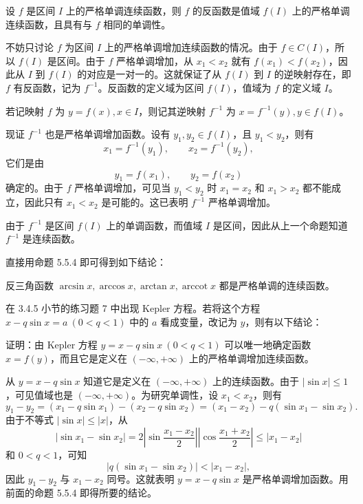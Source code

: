 \begin{xproposition}[5.5.4]
设 $f$ 是区间 $I$ 上的严格单调连续函数，则 $f$ 的反函数是值域 $f(I)$ 上的严格单调连续函数，且具有与 $f$ 相同的单调性。
\end{xproposition}
\begin{xproof}
不妨只讨论 $f$ 为区间 $I$ 上的严格单调增加连续函数的情况。由于 $f\in C(I)$，所以 $f(I)$ 是区间。由于 $f$ 严格单调增加，从 $x_1<x_2$ 就有 $f(x_1)<f(x_2)$，因此从 $I$ 到 $f(I)$ 的对应是一对一的。这就保证了从 $f(I)$ 到 $I$ 的逆映射存在，即 $f$ 有反函数，记为 $f^{-1}$。反函数的定义域为区间 $f(I)$，值域为 $f$ 的定义域 $I$。

若记映射 $f$ 为 $y=f(x),x\in I$，则记其逆映射 $f^{-1}$ 为 $x=f^{-1}(y),y\in f(I)$。

现证 $f^{-1}$ 也是严格单调增加函数。设有 $y_1,y_2\in f(I)$，且 $y_1<y_2$，则有
\[
  x_1=f^{-1}(y_1),\qquad x_2=f^{-1}(y_2),
\]
它们是由
\[
  y_1=f(x_1),\qquad y_2=f(x_2)
\]
确定的。由于 $f$ 严格单调增加，可见当 $y_1<y_2$ 时 $x_1=x_2$ 和 $x_1>x_2$ 都不能成立，因此只有 $x_1<x_2$ 是可能的。这已表明 $f^{-1}$ 严格单调增加。

由于 $f^{-1}$ 是区间 $f(I)$ 上的单调函数，而值域 $I$ 是区间，因此从上一个命题知道 $f^{-1}$ 是连续函数。
\end{xproof}

直接用命题 5.5.4 即可得到如下结论：

\begin{xexample}[5.5.1]
反三角函数 $\arcsin x,\arccos x,\arctan x,\operatorname{arccot}x$ 都是严格单调的连续函数。
\end{xexample}

在 3.4.5 小节的练习题 7 中出现 Kepler 方程。若将这个方程 $x-q\sin x=a\ (0<q<1)$ 中的 $a$ 看成变量，改记为 $y$，则有以下结论：

\begin{xexample}[5.5.2]
证明：由 Kepler 方程 $y=x-q\sin x\ (0<q<1)$ 可以唯一地确定函数 $x=f(y)$，而且它是定义在 $(-\infty,+\infty)$ 上的严格单调增加连续函数。
\end{xexample}
\begin{xproof}
从 $y=x-q\sin x$ 知道它是定义在 $(-\infty,+\infty)$ 上的连续函数。由于 $|\sin x|\le1$，可见值域也是 $(-\infty,+\infty)$。为研究单调性，设 $x_1<x_2$，则有
\[
  y_1-y_2=(x_1-q\sin x_1)-(x_2-q\sin x_2)=(x_1-x_2)-q(\sin x_1-\sin x_2).
\]
由于不等式 $|\sin x|\le|x|$，从
\[
  |\sin x_1-\sin x_2|=2\left|\sin\frac{x_1-x_2}{2}\right|\left|\cos\frac{x_1+x_2}{2}\right|\le|x_1-x_2|
\]
和 $0<q<1$，可知
\[
  |q(\sin x_1-\sin x_2)|<|x_1-x_2|,
\]
因此 $y_1-y_2$ 与 $x_1-x_2$ 同号。这就表明 $y=x-q\sin x$ 是严格单调增加函数。用前面的命题 5.5.4 即得所要的结论。
\end{xproof}

